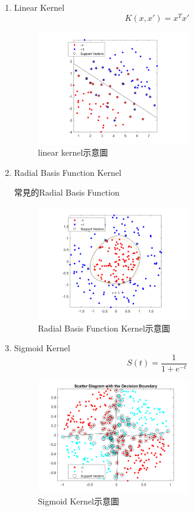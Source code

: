\begin{enumerate}
	\item
	      Linear Kernel
	      \begin{equation}
		      \label{eqn:LinearKernel}
		      K(x,x')=x^Tx'
	      \end{equation}

\begin{figure}[H]
	\centerline{\includegraphics[height=5cm]{pic/linear kernel.png}}
	\caption{linear kernel示意圖}
	\label{fig:linear kernel}
\end{figure}

	\item
	      Radial Basis Function Kernel
	      \begin{table}[h!]
		      \centering
		      \label{tab:rbf_table}
		      
		      \caption{常見的Radial Basis Function}
	      \end{table}
\begin{figure}[H]
	\centerline{\includegraphics[height=5cm]{pic/Radial Basis Function Kernel.png}}
	\caption{Radial Basis Function Kernel示意圖}
	\label{fig:Radial Basis}
\end{figure}
	\item
	      Sigmoid Kernel
	      \begin{equation}
		      \label{eqn:Sigmoid Kerne}
		      S(t)=\frac{1}{1+e^{-t}}
	      \end{equation}
\begin{figure}[H]
	\centerline{\includegraphics[height=5cm]{pic/Sigmoid Kernel.png}}
	\caption{Sigmoid Kernel示意圖}
	\label{Sigmoid Kernel}
\end{figure}


\end{enumerate}



